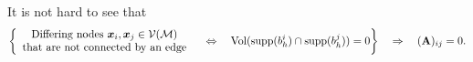 	It is not hard to see that 
	\[\left\{\begin{array}{c}
	\textrm{Differing nodes } \bm{x}_i,\bm{x}_j\in\mathcal{V}(\mathcal{M})\\
	\textrm{that are not connected by an edge}
	\end{array}\quad\Leftrightarrow\quad
	\mathrm{Vol}(\mathrm{supp}(b_h^i)\cap\mathrm{supp}(b_h^j))=0\right\}
	\quad \Rightarrow \quad (\mathbf{A})_{ij}=0.
	\]\vspace{-20pt}	
	\begin{figure}[!htbp]
\end{figure}
